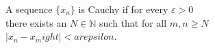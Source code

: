 \documentclass[preview]{standalone}
\begin{document}
\begin{center}
A sequence $\{x_n\}$ is Cauchy if for every $\varepsilon > 0$\\there exists an $N \in \mathbb{N}$ such that for all $m, n \geq N$\\$\big|x_n - x_m 
ight| < arepsilon$.
\end{center}
\end{document}
